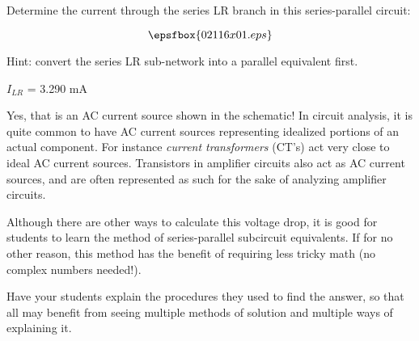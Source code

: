 

Determine the current through the series LR branch in this series-parallel circuit:

$$\epsfbox{02116x01.eps}$$

Hint: convert the series LR sub-network into a parallel equivalent first.







$I_{LR}$ = 3.290 mA







Yes, that is an AC current source shown in the schematic!  In circuit analysis, it is quite common to have AC current sources representing idealized portions of an actual component.  For instance {\it current transformers} (CT's) act very close to ideal AC current sources.  Transistors in amplifier circuits also act as AC current sources, and are often represented as such for the sake of analyzing amplifier circuits.

Although there are other ways to calculate this voltage drop, it is good for students to learn the method of series-parallel subcircuit equivalents.  If for no other reason, this method has the benefit of requiring less tricky math (no complex numbers needed!).

Have your students explain the procedures they used to find the answer, so that all may benefit from seeing multiple methods of solution and multiple ways of explaining it.




